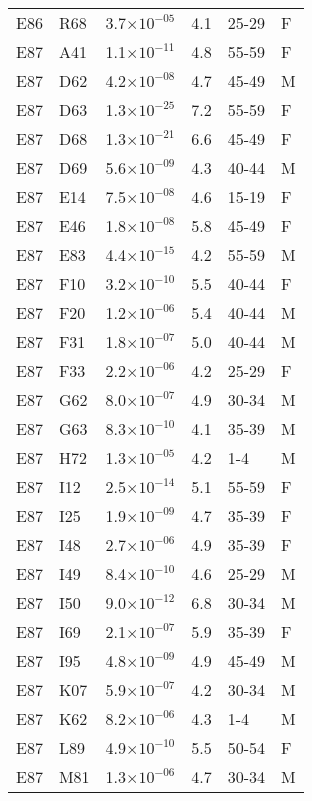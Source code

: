 \begin{longtable}{lllrll}
   E86 & R68 & 3.7$\times10^{-05}$ & 4.1 & 25-29 & F \\ 
   E87 & A41 & 1.1$\times10^{-11}$ & 4.8 & 55-59 & F \\ 
   E87 & D62 & 4.2$\times10^{-08}$ & 4.7 & 45-49 & M \\ 
   E87 & D63 & 1.3$\times10^{-25}$ & 7.2 & 55-59 & F \\ 
   E87 & D68 & 1.3$\times10^{-21}$ & 6.6 & 45-49 & F \\ 
   E87 & D69 & 5.6$\times10^{-09}$ & 4.3 & 40-44 & M \\ 
   E87 & E14 & 7.5$\times10^{-08}$ & 4.6 & 15-19 & F \\ 
   E87 & E46 & 1.8$\times10^{-08}$ & 5.8 & 45-49 & F \\ 
   E87 & E83 & 4.4$\times10^{-15}$ & 4.2 & 55-59 & M \\ 
   E87 & F10 & 3.2$\times10^{-10}$ & 5.5 & 40-44 & F \\ 
   E87 & F20 & 1.2$\times10^{-06}$ & 5.4 & 40-44 & M \\ 
   E87 & F31 & 1.8$\times10^{-07}$ & 5.0 & 40-44 & M \\ 
   E87 & F33 & 2.2$\times10^{-06}$ & 4.2 & 25-29 & F \\ 
   E87 & G62 & 8.0$\times10^{-07}$ & 4.9 & 30-34 & M \\ 
   E87 & G63 & 8.3$\times10^{-10}$ & 4.1 & 35-39 & M \\ 
   E87 & H72 & 1.3$\times10^{-05}$ & 4.2 & 1-4 & M \\ 
   E87 & I12 & 2.5$\times10^{-14}$ & 5.1 & 55-59 & F \\ 
   E87 & I25 & 1.9$\times10^{-09}$ & 4.7 & 35-39 & F \\ 
   E87 & I48 & 2.7$\times10^{-06}$ & 4.9 & 35-39 & F \\ 
   E87 & I49 & 8.4$\times10^{-10}$ & 4.6 & 25-29 & M \\ 
   E87 & I50 & 9.0$\times10^{-12}$ & 6.8 & 30-34 & M \\ 
   E87 & I69 & 2.1$\times10^{-07}$ & 5.9 & 35-39 & F \\ 
   E87 & I95 & 4.8$\times10^{-09}$ & 4.9 & 45-49 & M \\ 
   E87 & K07 & 5.9$\times10^{-07}$ & 4.2 & 30-34 & M \\ 
   E87 & K62 & 8.2$\times10^{-06}$ & 4.3 & 1-4 & M \\ 
   E87 & L89 & 4.9$\times10^{-10}$ & 5.5 & 50-54 & F \\ 
   E87 & M81 & 1.3$\times10^{-06}$ & 4.7 & 30-34 & M \\ 

\end{longtable}
